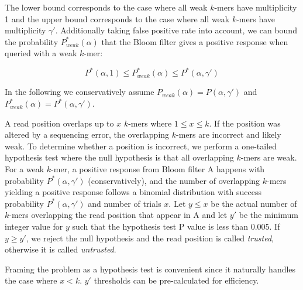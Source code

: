 \documentclass[10pt]{article}
\begin{document}
The lower bound corresponds to the case where all weak $k$-mers have multiplicity 1 and the upper bound corresponds to the case where all weak $k$-mers have multiplicity $\gamma'$.  Additionally taking false positive rate into account, we can bound the probability $P^*_{weak}(\alpha)$ that the Bloom filter gives a positive response when queried with a weak $k$-mer:

$$P^*(\alpha, 1) \leq P^*_{weak}(\alpha) \leq P^*(\alpha, \gamma')$$

In the following we conservatively assume $P_{weak}(\alpha) = P(\alpha, \gamma')$ and $P^*_{weak}(\alpha) = P^*(\alpha, \gamma')$.



A read position overlaps up to $x$ $k$-mers where $1\le x\le k$. If the position was altered by a sequencing error, the overlapping $k$-mers are incorrect and likely weak.  To determine whether a position is incorrect, we perform a one-tailed hypothesis test where the null hypothesis is that all overlapping $k$-mers are weak.  For a weak $k$-mer, a positive response from Bloom filter A happens with probability $P^*(\alpha, \gamma')$ (conservatively), and the number of overlapping $k$-mers yielding a positive response follows a binomial distribution with success probability $P^*(\alpha, \gamma')$ and number of trials $x$.  Let $y \leq x$ be the actual number of $k$-mers overlapping the read position that appear in A and let $y'$ be the minimum integer value for $y$ such that the hypothesis test P value is less than 0.005.  If $y \geq y'$, we reject the null hypothesis and the read position is called \emph{trusted}, otherwise it is called \emph{untrusted}.

Framing the problem as a hypothesis test is convenient since it naturally handles the case where $x<k$.  $y'$ thresholds can be pre-calculated for efficiency.

\end{document}
